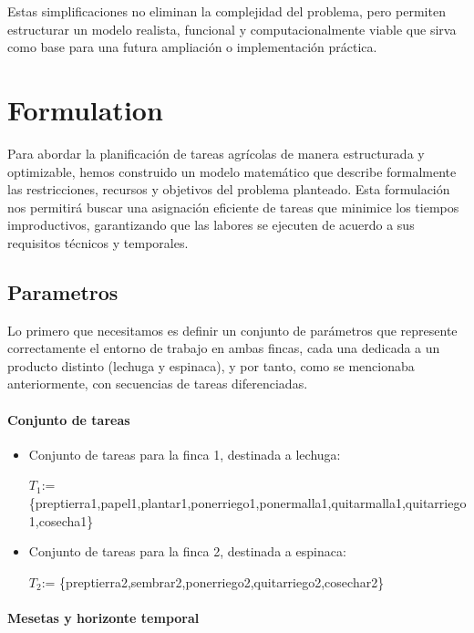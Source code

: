 Estas simplificaciones no eliminan la complejidad del problema, pero permiten estructurar un modelo realista, funcional y computacionalmente viable que sirva como base para una futura ampliación o implementación práctica.






\chapter*{Formulation}

Para abordar la planificación de tareas agrícolas de manera estructurada y optimizable, hemos construido un modelo matemático que describe formalmente las restricciones, recursos y objetivos del problema planteado.
Esta formulación nos permitirá buscar una asignación eficiente de tareas que minimice los tiempos improductivos, garantizando que las labores se ejecuten de acuerdo a sus requisitos técnicos y temporales.

\section*{Parametros}
Lo primero que necesitamos es definir un conjunto de parámetros que represente correctamente el entorno de trabajo en ambas fincas, cada una dedicada a un producto distinto (lechuga y espinaca),
y por tanto, como se mencionaba anteriormente, con secuencias de tareas diferenciadas.


\subsubsection{Conjunto de tareas}
\begin{itemize}
    \item Conjunto de tareas para la finca 1, destinada a lechuga:
    
    $T_1$:= \{preptierra1,papel1,plantar1,ponerriego1,ponermalla1,quitarmalla1,quitarriego1,cosecha1\}
    \item Conjunto de tareas para la finca 2, destinada a espinaca:
    
    $T_2$:= \{preptierra2,sembrar2,ponerriego2,quitarriego2,cosechar2\}
\end{itemize}

\subsubsection{Mesetas y horizonte temporal}


